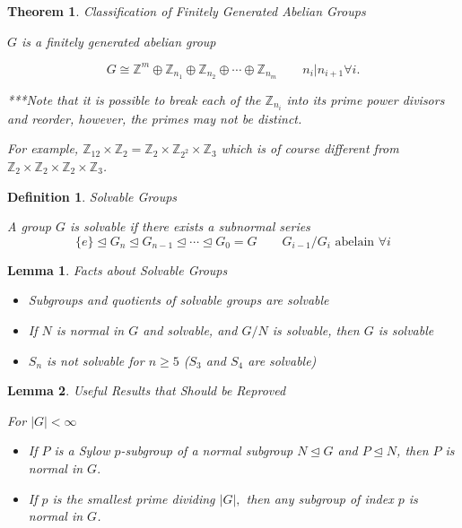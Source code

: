 \documentclass[12pt]{Qual}
\newtheorem{theorem}{Theorem}
\newtheorem{definition}{Definition}
\newtheorem{lemma}{Lemma}
\begin{document}
\begin{theorem}{\Large\textit{Classification of Finitely Generated Abelian Groups}}

 $G$ is a finitely generated abelian group

 $$G\cong\mathbb{Z}^m\oplus\mathbb{Z}_{n_1}\oplus\mathbb{Z}_{n_2}\oplus\cdots\oplus\mathbb{Z}_{n_m}\qquad n_i|n_{i+1} \forall i.$$

\begin{mybox}
***Note that it is possible to break each of the $\mathbb{Z}_{n_i}$ into its prime power divisors and reorder, however, the primes may not be distinct.

For example, $\mathbb{Z}_{12}\times\mathbb{Z}_2=\mathbb{Z}_2\times\mathbb{Z}_{2^2}\times\mathbb{Z}_3$ which is of course different from $\mathbb{Z}_2\times\mathbb{Z}_2\times\mathbb{Z}_2\times\mathbb{Z}_3$.
\end{mybox}

\end{theorem}
\vspace{0.5cm}
\begin{definition}{\Large\textit{Solvable Groups}}

A group $G$ is solvable if there exists a subnormal series $$\{e\}\trianglelefteq G_n\trianglelefteq G_{n-1}\trianglelefteq\cdots\trianglelefteq G_0=G\qquad G_{i-1}/G_i\text{ abelain }\forall i$$

\end{definition}
\vspace{0.5cm}
\begin{lemma}{\Large\textit{Facts about Solvable Groups}}

\begin{itemize}
\renewcommand\labelitemi{\faCoffee}
    \item Subgroups and quotients of solvable groups are solvable
    \item If $N$ is normal in $G$ and solvable, and $G/N$ is solvable, then $G$ is solvable
    \item $S_n$ is not solvable for $n\ge 5$ ($S_3$ and $S_4$ are solvable)
\end{itemize}

\end{lemma}
\vspace{0.5cm}
\begin{lemma}{\Large\textit{Useful Results that Should be Reproved}}

For $|G|<\infty$

\begin{itemize}
\renewcommand\labelitemi{\faCoffee}
    \item If $P$ is a Sylow $p$-subgroup of a normal subgroup $N\trianglelefteq G$ and $P\trianglelefteq N$, then $P$ is normal in $G.$
    \item If $p$ is the smallest prime dividing $|G|,$ then any subgroup of index $p$ is normal in $G$.
\end{itemize}

\end{lemma}
\end{document}
